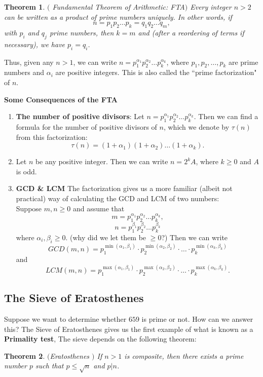 \documentclass[12pt]{article}
\theoremstyle{plain}
\newtheorem{theorem}{Theorem}
\theoremstyle{definition}
\theoremstyle{remark}
\begin{document}
\bigskip
\noindent
\begin{theorem}$($ Fundamental Theorem of Arithmetic: FTA$)$ Every integer $n>2$ can be written as a product of prime numbers uniquely. In other words, if $$n=p_1p_2\dots p_k = q_1q_2\dots q_m,$$ with $p_i$ and $q_j$ prime numbers, then $k=m$ and (after a reordering of terms if necessary), we have $p_i=q_i$. 
\end{theorem}

\bigskip
\noindent
Thus, given any $n>1$, we can write $n=p_1^{\alpha_1}p_2^{\alpha_2} \dots p_k^{\alpha_k}$, where $p_1, p_2, \dots, p_k$ are prime numbers and $\alpha_i$ are positive integers. This is also called the ``prime factorization" of $n$.

\bigskip
\noindent
{\bf Some Consequences of the FTA}
\\
\begin{enumerate}
    \item {\bf The number of positive divisors}: Let $n=p_1^{\alpha_1}p_2^{\alpha_2} \dots p_k^{\alpha_k}$. Then we can find a formula for the number of positive divisors of $n$, which we denote by $\tau(n)$ from this factorization:
    $$\tau(n)=(1+\alpha_1)(1+\alpha_2)\dots (1+\alpha_k).$$
    \item Let $n$ be any positive integer. Then we can write $n=2^kA$, where $k\geq 0$ and $A$ is odd. 
    \item {\bf GCD \& LCM} The factorization gives us a more familiar (albeit not practical) way of calculating the GCD and LCM of two numbers:
\\
Suppose $m,n \geq 0$ and assume that 
$$m=p_1^{\alpha_1}p_2^{\alpha_2} \dots p_k^{\alpha_k},$$
$$n=p_1^{\beta_1}p_2^{\beta_2} \dots p_k^{\beta_k}$$
where $\alpha_i, \beta_i \geq 0$. (why did we let them be $\geq 0$?)
Then we can write 
$$GCD(m,n) = p_1^{\min(\alpha_1, \beta_1)}\cdot p_2^{\min(\alpha_2, \beta_2)} \cdot \dots \cdot p_k^{\min(\alpha_k, \beta_k)}$$
and 
$$LCM(m,n) = p_1^{\max(\alpha_1, \beta_1)}\cdot p_2^{\max(\alpha_2, \beta_2)} \cdot \dots \cdot p_k^{\max(\alpha_k, \beta_k)}.$$
\end{enumerate}

\subsection{The Sieve of Eratosthenes} 
Suppose we want to determine whether $659$ is prime or not. How can we answer this? The Sieve of Eratosthenes gives us the first example of what is known as a {\bf Primality test}, The sieve depends on the following theorem:
\begin{theorem} $($Eratosthenes $)$
If $n>1$ is composite, then there exists a prime number $p$ such that $p\leq \sqrt{n}$ and $p|n$. 
\end{theorem}
\end{document}
